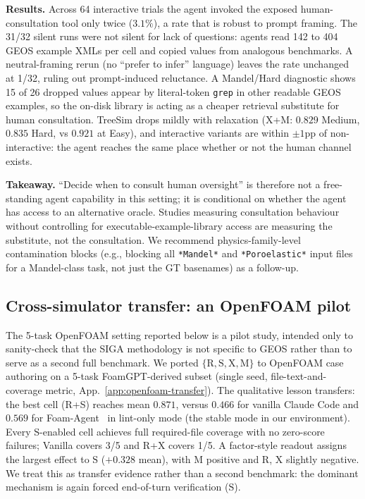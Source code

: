 \documentclass{article}
\begin{document}
\textbf{Results.} Across 64 interactive trials the agent invoked the exposed human-consultation tool only twice ($3.1\%$), a rate that is robust to prompt framing. The 31/32 silent runs were not silent for lack of questions: agents read 142 to 404 GEOS example XMLs per cell and copied values from analogous benchmarks. A neutral-framing rerun (no ``prefer to infer'' language) leaves the rate unchanged at 1/32, ruling out prompt-induced reluctance. A Mandel/Hard diagnostic shows 15 of 26 dropped values appear by literal-token \texttt{grep} in other readable GEOS examples, so the on-disk library is acting as a cheaper retrieval substitute for human consultation. TreeSim drops mildly with relaxation (X+M: $0.829$ Medium, $0.835$ Hard, vs $0.921$ at Easy), and interactive variants are within $\pm 1$pp of non-interactive: the agent reaches the same place whether or not the human channel exists.

\textbf{Takeaway.} ``Decide when to consult human oversight'' is therefore not a free-standing agent capability in this setting; it is conditional on whether the agent has access to an alternative oracle. Studies measuring consultation behaviour without controlling for executable-example-library access are measuring the substitute, not the consultation. We recommend physics-family-level contamination blocks (e.g., blocking all \texttt{*Mandel*} and \texttt{*Poroelastic*} input files for a Mandel-class task, not just the GT basenames) as a follow-up.

\subsection{Cross-simulator transfer: an OpenFOAM pilot}
\label{subsec:openfoam-transfer}

The 5-task OpenFOAM setting reported below is a pilot study, intended only to sanity-check that the SIGA methodology is not specific to GEOS rather than to serve as a second full benchmark. We ported $\{\mathrm{R,S,X,M}\}$ to OpenFOAM case authoring on a 5-task FoamGPT-derived subset (single seed, file-text-and-coverage metric, App.~\ref{app:openfoam-transfer}). The qualitative lesson transfers: the best cell (R+S) reaches mean $0.871$, versus $0.466$ for vanilla Claude Code and $0.569$ for Foam-Agent~\citep{foamagent2025} in lint-only mode (the stable mode in our environment). Every $\mathrm{S}$-enabled cell achieves full required-file coverage with no zero-score failures; Vanilla covers 3/5 and R+X covers 1/5. A factor-style readout assigns the largest effect to $\mathrm{S}$ ($+0.328$ mean), with $\mathrm{M}$ positive and $\mathrm{R}$, $\mathrm{X}$ slightly negative. We treat this as transfer evidence rather than a second benchmark: the dominant mechanism is again forced end-of-turn verification ($\mathrm{S}$).
\end{document}
